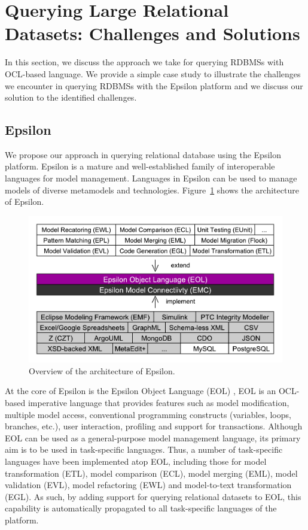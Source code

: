 \section{Querying Large Relational Datasets: Challenges and Solutions}
\label{sec:approach}
In this section, we discuss the approach we take for querying RDBMSs with OCL-based language. 
We provide a simple case study to illustrate the challenges we encounter in querying RDBMSs with the Epsilon platform and we discuss our solution to the identified challenges.

\subsection{Epsilon}
We propose our approach in querying relational database using the Epsilon~\cite{EpsilonICECCS} platform.
Epsilon is a mature and well-established family of interoperable languages for model management. 
Languages in Epsilon can be used to manage models of diverse metamodels and technologies. 
Figure~\ref{fig:epsilon} shows the architecture of Epsilon.

\begin{figure}[ht]
	\centering
	\includegraphics[width=1\textwidth]{images/epsilon-architecture.pdf}
	\caption{Overview of the architecture of Epsilon.}
	\label{fig:epsilon}
\end{figure}

At the core of Epsilon is the Epsilon Object Language (EOL) \cite{EOL}, EOL is an OCL-based imperative language that provides features such as model modification, multiple model access, conventional programming constructs (variables, loops, branches, etc.), user interaction, profiling and support for transactions.
Although EOL can be used as a general-purpose model management language, its primary aim is to be used in task-specific languages.
Thus, a number of task-specific languages have been implemented atop EOL, including those for model transformation (ETL), model comparison (ECL), model merging (EML), model validation (EVL), model refactoring (EWL) and model-to-text transformation (EGL). 
As such, by adding support for querying relational datasets to EOL, this capability is automatically propagated to all task-specific languages of the platform. 

